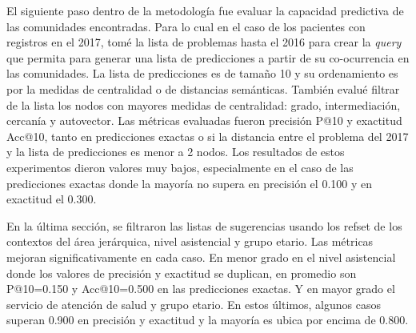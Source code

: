 El siguiente paso dentro de la metodología fue evaluar la capacidad predictiva de las comunidades encontradas. Para lo cual en el caso de los pacientes con registros en el 2017, tomé la lista de problemas hasta el 2016 para crear la \textit{query} que permita para generar una lista de predicciones a partir de su co-ocurrencia en las comunidades. La lista de predicciones es de tamaño 10 y su ordenamiento es por la medidas de centralidad o de distancias semánticas. También evalué filtrar de la lista los nodos con mayores medidas de centralidad: grado, intermediación, cercanía y autovector. Las métricas evaluadas fueron precisión P@10 y exactitud Acc@10, tanto en predicciones exactas o si la distancia entre el problema del 2017 y la lista de predicciones es menor a 2 nodos. Los resultados de estos experimentos dieron valores muy bajos, especialmente en el caso de las predicciones exactas donde la mayoría no supera en precisión el \num{0.100} y en exactitud el \num{0.300}.

En la última sección, se filtraron las listas de sugerencias usando los \acrshort{refset} de los contextos del área jerárquica, nivel asistencial y grupo etario. Las métricas mejoran significativamente en cada caso. En menor grado en el nivel asistencial donde los valores de precisión y exactitud se duplican, en promedio son P@10=\num{0.150} y Acc@10=\num{0.500} en las predicciones exactas. Y en mayor grado el servicio de atención de salud y grupo etario. En estos últimos, algunos casos superan \num{0.900} en precisión y exactitud y la mayoría es ubica por encima de \num{0.800}.

